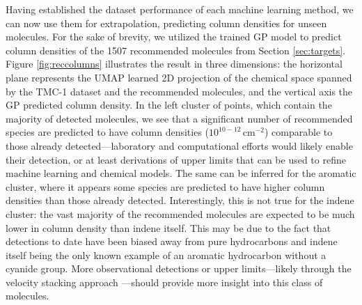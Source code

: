 \documentclass[twocolumn]{aastex63}
\begin{document}
Having established the dataset performance of each machine learning method, we can now use them for extrapolation, predicting column densities for unseen molecules. For the sake of brevity, we utilized the trained GP model to predict column densities of the 1507 recommended molecules from Section \ref{sec:targets}. Figure \ref{fig:reccolumns} illustrates the result in three dimensions: the horizontal plane represents the UMAP learned 2D projection of the chemical space spanned by the TMC-1 dataset and the recommended molecules, and the vertical axis the GP predicted column density. In the left cluster of points, which contain the majority of detected molecules, we see that a significant number of recommended species are predicted to have column densities ($10^{10-12}$\,cm$^{-2}$) comparable to those already detected---laboratory and computational efforts would likely enable their detection, or at least derivations of upper limits that can be used to refine machine learning and chemical models. The same can be inferred for the aromatic cluster, where it appears some species are predicted to have higher column densities than those already detected. Interestingly, this is not true for the indene cluster: the vast majority of the recommended molecules are expected to be much lower in column density than indene itself. This may be due to the fact that detections to date have been biased away from pure hydrocarbons and indene itself being the only known example of an aromatic hydrocarbon without a cyanide group. More observational detections or upper limits---likely through the velocity stacking approach \citep{Loomis_2021}---should provide more insight into this class of molecules.
\end{document}
